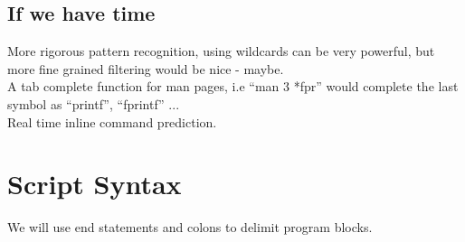 \documentclass[a4paper,12pt]{article}
\begin{document}
\subsection*{If we have time}
More rigorous pattern recognition, using wildcards can be very powerful, but more fine grained filtering would be nice - maybe.\\[0.5cm]
A tab complete function for man pages, i.e ``man 3 *fpr'' would complete the last symbol as ``printf'',  ``fprintf'' ...\\[0.5cm]
Real time inline command prediction.

\pagebreak
\section*{Script Syntax}

We will use end statements and colons to delimit program blocks.
\end{document}
